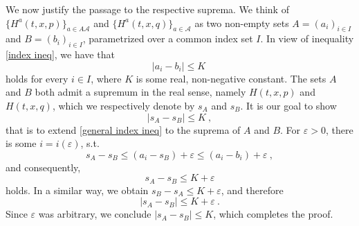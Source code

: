 We now justify the passage to the respective suprema. We think of $ \{H^a(t, x, p)\}_{a \in A
\mathcal{A}} $ and $ \{H^{a}(t, x, q)\}_{a \in \mathcal{A}} $ as two non-empty sets $ A = (a_i)_{i \in I} $ and $ B = (b_i)_{i \in I} $, parametrized over a common index set $ I $. In view of inequality \eqref{index ineq}, we have that
\begin{equation}
	\label{general index ineq}
	\lvert a_i  - b_i \rvert \leq K \ 
\end{equation}
holds for every $ i \in I $, where $ K $ is some real, non-negative constant. The sets $ A $ and $ B $ both admit a supremum in the real sense, namely $ H(t, x, p) $ and $ H(t, x, q) $, which we respectively denote by
$ s_A $ and $ s_B $. It is our goal to show
\begin{equation*}
\lvert s_A - s_B \rvert \leq K \ ,
\end{equation*}
that is to extend \ref{general index ineq} to the suprema of $ A $ and $ B $. For $ \varepsilon > 0 $, there is some $ i = i(\varepsilon) $, s.t.
\begin{equation*}
	s_A - s_B \leq (a_i - s_B) + \varepsilon \leq (a_i - b_i) + \varepsilon \ ,
\end{equation*}
and consequently,
\begin{equation*}
	s_A - s_B \leq K + \varepsilon 
\end{equation*}
holds. In a similar way, we obtain $ s_B - s_A \leq K + \varepsilon $, and therefore 
\begin{equation*}
	\lvert s_A - s_B \rvert \leq K + \varepsilon \ .
\end{equation*}
Since $ \varepsilon $ was arbitrary, we conclude $ \lvert s_A - s_B \rvert \leq K $, which completes the proof.